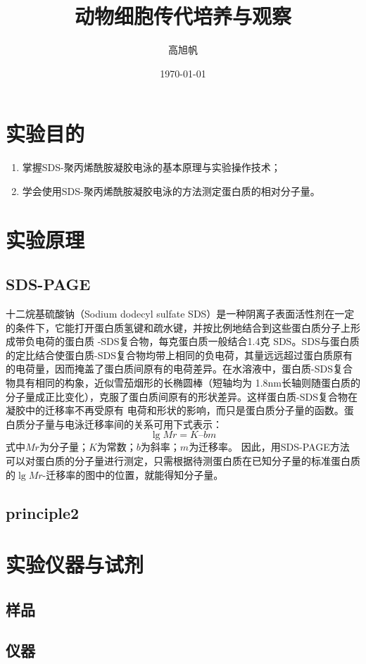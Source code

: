 \documentclass[UTF8,12pt,a4paper]{article}
\title{动物细胞传代培养与观察}
\author{高旭帆}
\date{\today}
\begin{document}
\maketitle\xiaosi\songti
\thispagestyle{empty}

\section{实验目的}
\begin{enumerate}
	\setlength{\itemsep}{-5pt} 
	\item 掌握SDS-聚丙烯酰胺凝胶电泳的基本原理与实验操作技术；
	\item 学会使用SDS-聚丙烯酰胺凝胶电泳的方法测定蛋白质的相对分子量。
\end{enumerate}

\section{实验原理}
\subsection{SDS-PAGE}
十二烷基硫酸钠（Sodium dodecyl sulfate SDS）是一种阴离子表面活性剂在一定的条件下，它能打开蛋白质氢键和疏水键，并按比例地结合到这些蛋白质分子上形成带负电荷的蛋白质 -SDS复合物，每克蛋白质一般结合1.4克 SDS。SDS与蛋白质的定比结合使蛋白质-SDS复合物均带上相同的负电荷，其量远远超过蛋白质原有的电荷量，因而掩盖了蛋白质间原有的电荷差异。在水溶液中，蛋白质-SDS复合物具有相同的构象，近似雪茄烟形的长椭圆棒（短轴均为 1.8nm长轴则随蛋白质的分子量成正比变化），克服了蛋白质间原有的形状差异。这样蛋白质-SDS复合物在凝胶中的迁移率不再受原有 电荷和形状的影响，而只是蛋白质分子量的函数。蛋白质分子量与电泳迁移率间的关系可用下式表示：
$$\lg Mr = K – bm$$
式中$Mr$为分子量；$K$为常数；$b$为斜率；$m$为迁移率。
因此，用SDS-PAGE方法 可以对蛋白质的分子量进行测定，只需根据待测蛋白质在已知分子量的标准蛋白质的$\lg Mr$-迁移率的图中的位置，就能得知分子量。
\subsection{principle2}

\section{实验仪器与试剂}
\subsection{样品}
\subsection{仪器}
\end{document}
